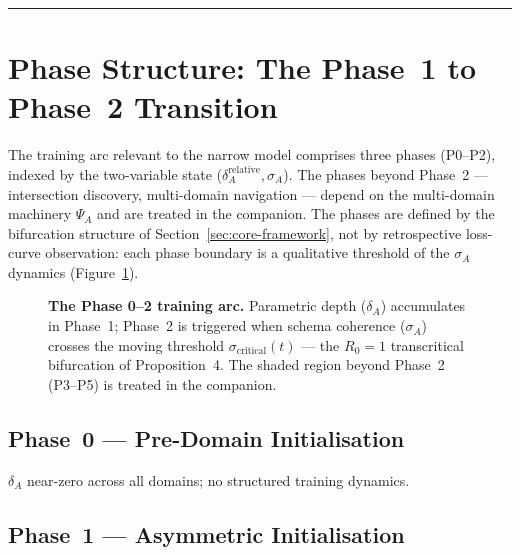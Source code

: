 \documentclass{article}
\providecommand{\Description}[1]{}
\theoremstyle{definition}
\begin{document}
\noindent\rule{\linewidth}{0.4pt}

\section{Phase Structure: The Phase~1 to Phase~2 Transition}\label{sec:phase-structure}

The training arc relevant to the narrow model comprises three phases
(P0--P2), indexed by the two-variable state
($\delta_A^{\text{relative}}, \sigma_A$). The phases beyond Phase~2 ---
intersection discovery, multi-domain navigation --- depend on the
multi-domain machinery $\Psi_A$ and are treated in the companion. The
phases are defined by the bifurcation structure of
Section~\ref{sec:core-framework}, not by retrospective loss-curve
observation: each phase boundary is a qualitative threshold of the
$\sigma_A$ dynamics (Figure~\ref{fig:phases}).

\begin{figure}[htbp]
\centering
\resizebox{\textwidth}{!}{}
\caption{\textbf{The Phase 0--2 training arc.} Parametric depth
($\delta_A$) accumulates in Phase~1; Phase~2 is triggered when schema
coherence ($\sigma_A$) crosses the moving threshold
$\sigma_{\text{critical}}(t)$ --- the $R_0 = 1$ transcritical
bifurcation of Proposition~4. The shaded region beyond Phase~2
(P3--P5) is treated in the companion.}
\Description{A time-series plot with Training Time on the x-axis and Normalised Value [0,1] on the y-axis. Three curves: delta_A_relative (solid black logistic curve), sigma_A (solid blue, crosses sigma_critical at a red star marker at the Phase 1-2 boundary then rises sharply). Background shading delineates the phases. A phase bar below labels each phase; the region beyond Phase 2 is shaded grey and labelled as treated in the companion.}
\label{fig:phases}
\end{figure}

\subsection*{Phase~0 --- Pre-Domain Initialisation}

$\delta_A$ near-zero across all domains; no structured training
dynamics.

\subsection*{Phase~1 --- Asymmetric Initialisation}
\end{document}
